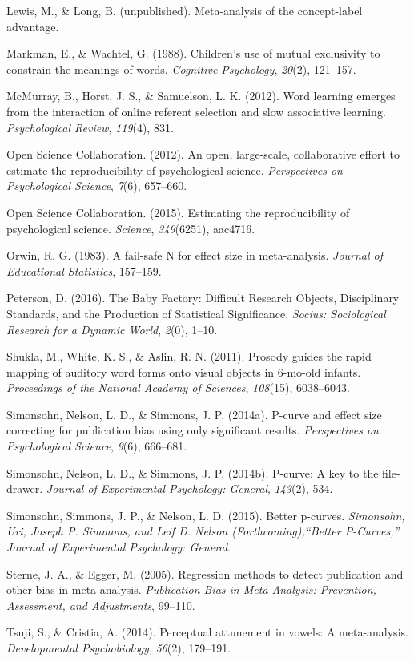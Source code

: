 \documentclass[english,floatsintext,man]{apa6}
\begin{document}
\hypertarget{ref-lewisunpublished}{}
Lewis, M., \& Long, B. (unpublished). Meta-analysis of the concept-label
advantage.

\hypertarget{ref-markman1988}{}
Markman, E., \& Wachtel, G. (1988). Children's use of mutual exclusivity
to constrain the meanings of words. \emph{Cognitive Psychology},
\emph{20}(2), 121--157.

\hypertarget{ref-mcmurray2012word}{}
McMurray, B., Horst, J. S., \& Samuelson, L. K. (2012). Word learning
emerges from the interaction of online referent selection and slow
associative learning. \emph{Psychological Review}, \emph{119}(4), 831.

\hypertarget{ref-open2012open}{}
Open Science Collaboration. (2012). An open, large-scale, collaborative
effort to estimate the reproducibility of psychological science.
\emph{Perspectives on Psychological Science}, \emph{7}(6), 657--660.

\hypertarget{ref-open2015estimating}{}
Open Science Collaboration. (2015). Estimating the reproducibility of
psychological science. \emph{Science}, \emph{349}(6251), aac4716.

\hypertarget{ref-orwin1983fail}{}
Orwin, R. G. (1983). A fail-safe N for effect size in meta-analysis.
\emph{Journal of Educational Statistics}, 157--159.

\hypertarget{ref-Peterson:2016}{}
Peterson, D. (2016). The Baby Factory: Difficult Research Objects,
Disciplinary Standards, and the Production of Statistical Significance.
\emph{Socius: Sociological Research for a Dynamic World}, \emph{2}(0),
1--10.

\hypertarget{ref-shukla2011prosody}{}
Shukla, M., White, K. S., \& Aslin, R. N. (2011). Prosody guides the
rapid mapping of auditory word forms onto visual objects in 6-mo-old
infants. \emph{Proceedings of the National Academy of Sciences},
\emph{108}(15), 6038--6043.

\hypertarget{ref-simonsohn2014power}{}
Simonsohn, Nelson, L. D., \& Simmons, J. P. (2014a). P-curve and effect
size correcting for publication bias using only significant results.
\emph{Perspectives on Psychological Science}, \emph{9}(6), 666--681.

\hypertarget{ref-simonsohn2014p}{}
Simonsohn, Nelson, L. D., \& Simmons, J. P. (2014b). P-curve: A key to
the file-drawer. \emph{Journal of Experimental Psychology: General},
\emph{143}(2), 534.

\hypertarget{ref-simonsohn2015better}{}
Simonsohn, Simmons, J. P., \& Nelson, L. D. (2015). Better p-curves.
\emph{Simonsohn, Uri, Joseph P. Simmons, and Leif D. Nelson
(Forthcoming),``Better P-Curves,'' Journal of Experimental Psychology:
General}.

\hypertarget{ref-sterne2005regression}{}
Sterne, J. A., \& Egger, M. (2005). Regression methods to detect
publication and other bias in meta-analysis. \emph{Publication Bias in
Meta-Analysis: Prevention, Assessment, and Adjustments}, 99--110.

\hypertarget{ref-tsuji2014perceptual}{}
Tsuji, S., \& Cristia, A. (2014). Perceptual attunement in vowels: A
meta-analysis. \emph{Developmental Psychobiology}, \emph{56}(2),
179--191.
\end{document}
